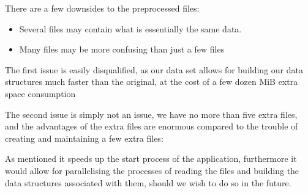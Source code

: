 
There are a few downsides to the preprocessed files:
\begin{itemize}
	\item Several files may contain what is essentially the same data.
	\item Many files may be more confusing than just a few files
\end{itemize}

The first issue is easily disqualified, as our data set allows for building our data structures much faster than the original, at the cost of a few dozen MiB extra space consumption

The second issue is simply not an issue, we have no more than five extra files, and the advantages of the extra files are enormous compared to the trouble of creating and maintaining a few extra files:

As mentioned it speeds up the start process of the application, furthermore it would allow for parallelising the processes of reading the files and building the data structures associated with them, should we wish to do so in the future.
